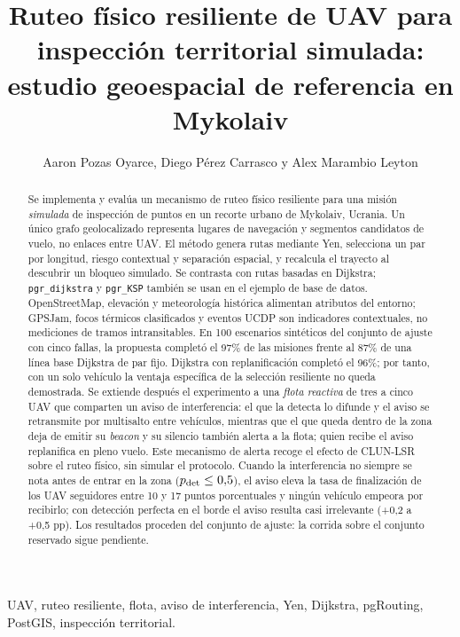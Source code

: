 \documentclass[journal,10pt]{IEEEtran}
\begin{document}
\title{Ruteo físico resiliente de UAV para inspección territorial simulada: estudio geoespacial de referencia en Mykolaiv}
\author{Aaron Pozas Oyarce, Diego Pérez Carrasco y Alex Marambio Leyton}
\maketitle

\begin{abstract}
Se implementa y evalúa un mecanismo de ruteo físico resiliente para una misión
\emph{simulada} de inspección de puntos en un recorte urbano de Mykolaiv,
Ucrania. Un único grafo geolocalizado representa lugares de navegación y
segmentos candidatos de vuelo, no enlaces entre UAV. El método genera rutas
mediante Yen, selecciona un par por longitud, riesgo contextual y separación
espacial, y recalcula el trayecto al descubrir un bloqueo simulado. Se
contrasta con rutas basadas en Dijkstra; \texttt{pgr\_dijkstra} y
\texttt{pgr\_KSP} también se usan en el ejemplo de base de datos.
OpenStreetMap, elevación y meteorología histórica alimentan atributos del
entorno; GPSJam, focos térmicos clasificados y eventos UCDP son indicadores
contextuales, no mediciones de tramos intransitables. En 100 escenarios
sintéticos del
conjunto de ajuste con cinco fallas, la propuesta completó el 97\% de las
misiones frente al 87\% de una línea base Dijkstra de par fijo. Dijkstra con
replanificación completó el 96\%; por tanto, con un solo vehículo la ventaja
específica de la selección resiliente no queda demostrada. Se extiende después
el experimento a una \emph{flota reactiva} de tres a cinco UAV que comparten un
aviso de interferencia: el que la detecta lo difunde y el aviso se retransmite
por multisalto entre vehículos, mientras que el que queda dentro de la zona deja
de emitir su \emph{beacon} y su silencio también alerta a la flota; quien recibe
el aviso replanifica en pleno vuelo. Este mecanismo de alerta recoge el efecto
de CLUN-LSR sobre el ruteo físico, sin simular el protocolo. Cuando la
interferencia no siempre se nota antes de entrar en la zona
($p_{\rm det}\leq 0{,}5$), el aviso eleva la tasa de finalización de los UAV
seguidores entre 10 y 17 puntos porcentuales y ningún vehículo empeora por
recibirlo; con detección perfecta en el borde el aviso resulta casi irrelevante
(+0,2 a +0,5 pp). Los resultados proceden del conjunto de ajuste: la corrida
sobre el conjunto reservado sigue pendiente.
\end{abstract}

\begin{IEEEkeywords}
UAV, ruteo resiliente, flota, aviso de interferencia, Yen, Dijkstra, pgRouting,
PostGIS, inspección territorial.
\end{IEEEkeywords}
\end{document}
